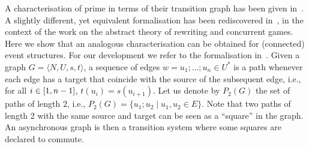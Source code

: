 A characterisation  of prime {\esabbr} in terms of their transition
graph has been given in~\cite{PU:RMC}. A slightly different, yet
equivalent formalisation has been rediscovered in~\cite{Mel:hab}, in the
context of the work on the abstract theory of rewriting and concurrent
games.
%
Here we show that an analogous characterisation can be obtained for (connected)
event structures. For our development we refer to the formalisation in~\cite{Mel:hab}.
%
Given a graph $G = \langle N, U, s, t \rangle$, a sequence of edges
$w = u_1; \ldots; u_n \in U^*$ is a path whenever each edge has a
target that coincide with the source of the subsequent edge, i.e., for
all $i \in [{1},{n-1}]$, $t(u_i) = s(u_{i+1})$.
%
Let us denote by $P_2(G)$ the set of paths of length $2$, i.e.,
$P_2(G) = \{ u_1; u_2 \mid u_1, u_2 \in E \}$. Note that two paths of
length 2 with the same source and target can be seen as a ``square''
in the graph. An asynchronous graph is then a transition system where
some squares are declared to commute.

